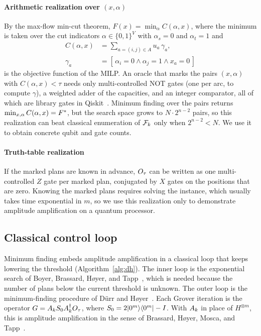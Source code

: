 \paragraph{Arithmetic realization over $(x,\alpha)$} By the max-flow min-cut theorem, $F(x)=\min_{\alpha}C(\alpha,x)$, where the minimum is taken over the cut indicators $\alpha\in\{0,1\}^{V}$ with $\alpha_s=0$ and $\alpha_t=1$ and
\begin{equation}\label{eq:cut-alpha}
\begin{aligned}
C(\alpha,x)&=\textstyle\sum_{a=(i,j)\in A} u_a\,\gamma_a,\\
\gamma_a &= [\,\alpha_i=0 \wedge \alpha_j=1 \wedge x_a=0\,]
\end{aligned}
\end{equation}
is the objective function of the MILP. An oracle that marks the pairs $(x,\alpha)$ with $C(\alpha,x)<\tau$ needs only multi-controlled NOT gates (one per arc, to compute $\gamma$), a weighted adder of the capacities, and an integer comparator, all of which are library gates in Qiskit~\cite{qiskit2024}. Minimum finding over the pairs returns $\min_{x,\alpha}C(\alpha,x)=F^{*}$, but the search space grows to $N\cdot 2^{n-2}$ pairs, so this realization can beat classical enumeration of $\mathcal{F}_k$ only when $2^{n-2}<N$. We use it to obtain concrete qubit and gate counts.

\paragraph{Truth-table realization} If the marked plans are known in advance, $O_\tau$ can be written as one multi-controlled $Z$ gate per marked plan, conjugated by $X$ gates on the positions that are zero. Knowing the marked plans requires solving the instance, which usually takes time exponential in $m$, so we use this realization only to demonstrate amplitude amplification on a quantum processor.

\subsection{Classical control loop}
Minimum finding embeds amplitude amplification in a classical loop that keeps lowering the threshold (Algorithm~\ref{alg:dh}). The inner loop is the exponential search of Boyer, Brassard, H{\o}yer, and Tapp~\cite{bbht1998}, which is needed because the number of plans below the current threshold is unknown. The outer loop is the minimum-finding procedure of D\"urr and H{\o}yer~\cite{durr1996}. Each Grover iteration is the operator $G=A_k S_0A_k^{\dagger}O_\tau$, where $S_0=2\lvert 0^m \rangle\langle 0^m \rvert-I$. With $A_k$ in place of $H^{\otimes m}$, this is amplitude amplification in the sense of Brassard, H{\o}yer, Mosca, and Tapp~\cite{bhmt2002}.

